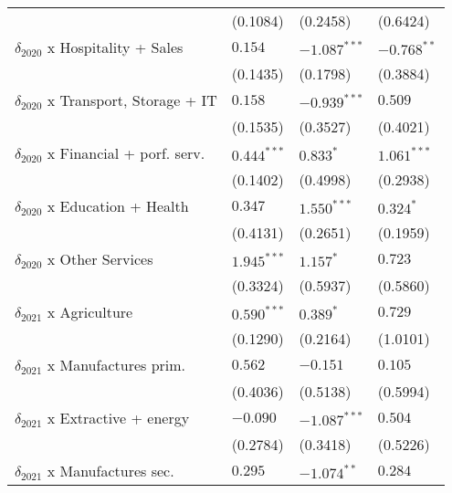 \begin{tabular}{llll}
                                                   &        (0.1084) &        (0.2458) &        (0.6424) \\
$\delta_{2020}$ x Hospitality + Sales              &         $0.154$ &  $-1.087^{***}$ &   $-0.768^{**}$ \\
                                                   &        (0.1435) &        (0.1798) &        (0.3884) \\
$\delta_{2020}$ x Transport, Storage + IT          &         $0.158$ &  $-0.939^{***}$ &         $0.509$ \\
                                                   &        (0.1535) &        (0.3527) &        (0.4021) \\
$\delta_{2020}$ x Financial + porf. serv.          &   $0.444^{***}$ &       $0.833^*$ &   $1.061^{***}$ \\
                                                   &        (0.1402) &        (0.4998) &        (0.2938) \\
$\delta_{2020}$ x Education + Health               &         $0.347$ &   $1.550^{***}$ &       $0.324^*$ \\
                                                   &        (0.4131) &        (0.2651) &        (0.1959) \\
$\delta_{2020}$ x Other Services                   &   $1.945^{***}$ &       $1.157^*$ &         $0.723$ \\
                                                   &        (0.3324) &        (0.5937) &        (0.5860) \\
$\delta_{2021}$ x Agriculture                      &   $0.590^{***}$ &       $0.389^*$ &         $0.729$ \\
                                                   &        (0.1290) &        (0.2164) &        (1.0101) \\
$\delta_{2021}$ x Manufactures prim.               &         $0.562$ &        $-0.151$ &         $0.105$ \\
                                                   &        (0.4036) &        (0.5138) &        (0.5994) \\
$\delta_{2021}$ x Extractive + energy              &        $-0.090$ &  $-1.087^{***}$ &         $0.504$ \\
                                                   &        (0.2784) &        (0.3418) &        (0.5226) \\
$\delta_{2021}$ x Manufactures sec.                &         $0.295$ &   $-1.074^{**}$ &         $0.284$ \\

\end{tabular}
